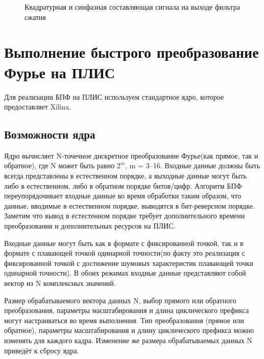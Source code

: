 \begin{figure}[h]
    \centering
    \noindent
    \caption{Квадратурная и синфазная составляющая сигнала на выходе фильтра сжатия}
    \label{fig:correl}
\end{figure}


\section{Выполнение быстрого преобразование Фурье на ПЛИС}

Для реализации БПФ на ПЛИС используем стандартное ядро, которое предоставляет Xilinx.

\subsection{Возможности ядра}

Ядро вычисляет N-точечное дискретное преобразование Фурье(как прямое, так и обратное), где N может быть равно $2^m$, m = 3–16. Входные данные должны быть всегда представлены в естественном порядке, а выходные данные могут быть либо в естественном, либо в обратном порядке битов/цифр. Алгоритм БПФ переупорядочивает входные данные во время обработки таким образом, что данные, вводимые в естественном порядке, выводятся в бит-реверсном порядке. Заметим что вывод в естестенном порядке требует дополнительного времени преобразования и дополнительных ресурсов на ПЛИС.  

Входные данные могут быть как в формате с фиксированной точкой, так и в формате с плавающей точкой одинарной точности(по факту это реализация с фиксированной точкой с достижение шумовых характеристик плавающей точки одинарной точности). В обоих режимах входные данные представляют собой вектор из N комплексных значений. 

Размер обрабатываемого вектора данных N, выбор прямого или обратного преобразования, параметры масштабирования и длина циклического префикса могут настраиваться во время выполнения. Тип преобразования (прямое или обратное), параметры масштабирования и длину циклического префикса можно изменять для каждого кадра. Изменение же размера обрабатываемых данных N приведёт к сбросу ядра. 

